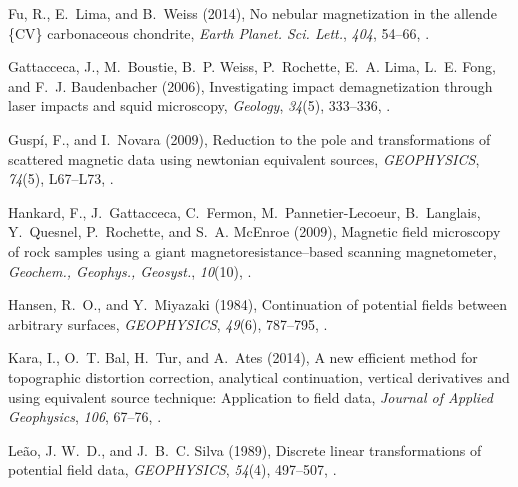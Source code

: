 \documentclass[draft,gc]{agutex}
\begin{document}
\begin{article}
\begin{thebibliography}{39}
Fu, R., E.~Lima, and B.~Weiss (2014), No nebular magnetization in the allende
  \{CV\} carbonaceous chondrite, \textit{Earth Planet. Sci. Lett.},
  \textit{404}, 54--66, .

Gattacceca, J., M.~Boustie, B.~P. Weiss, P.~Rochette, E.~A. Lima, L.~E. Fong,
  and F.~J. Baudenbacher (2006), Investigating impact demagnetization through
  laser impacts and squid microscopy, \textit{Geology}, \textit{34}(5),
  333--336, .

Gusp\'{i}, F., and I.~Novara (2009), Reduction to the pole and transformations
  of scattered magnetic data using newtonian equivalent sources,
  \textit{GEOPHYSICS}, \textit{74}(5), L67--L73, .

Hankard, F., J.~Gattacceca, C.~Fermon, M.~Pannetier-Lecoeur, B.~Langlais,
  Y.~Quesnel, P.~Rochette, and S.~A. McEnroe (2009), Magnetic field microscopy
  of rock samples using a giant magnetoresistance–based scanning
  magnetometer, \textit{Geochem., Geophys., Geosyst.}, \textit{10}(10),
  .

Hansen, R.~O., and Y.~Miyazaki (1984), Continuation of potential fields between
  arbitrary surfaces, \textit{GEOPHYSICS}, \textit{49}(6), 787--795,
  .

Kara, I., O.~T. Bal, H.~Tur, and A.~Ates (2014), A new efficient method for
  topographic distortion correction, analytical continuation, vertical
  derivatives and using equivalent source technique: Application to field data,
  \textit{Journal of Applied Geophysics}, \textit{106}, 67--76,
  .

Le\~{a}o, J. W.~D., and J.~B.~C. Silva (1989), Discrete linear transformations
  of potential field data, \textit{GEOPHYSICS}, \textit{54}(4), 497--507,
  .


\end{thebibliography}
\end{article}
\end{document}
